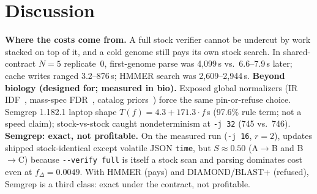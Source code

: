 \documentclass[letterpaper,twocolumn,10pt]{article}
\theoremstyle{definition}
\begin{document}
\section{Discussion}
\label{sec:discussion}

\textbf{Where the costs come from.}
A full stock verifier cannot be undercut by work stacked on top of it, and a cold genome still pays its own stock search.
In shared\nobreakdash-contract $N{=}5$ replicate~0, first\nobreakdash-genome parse was 4{,}099\,s vs.\ 6.6--7.9\,s later; cache writes
ranged 3.2--876\,s; HMMER search was 2{,}609--2{,}944\,s.
\textbf{Beyond biology (designed for; measured in bio).}
Exposed global normalizers (IR IDF~\cite{hadjieleftheriou2009incremental,staudinger2024reproducible}, mass\nobreakdash-spec
{FDR}~\cite{frank2011spectral,aggarwal2022fdr}, catalog priors~\cite{delchambre2023gaia}) force the same pin\nobreakdash-or\nobreakdash-refuse
choice. Semgrep 1.182.1 laptop shape $T(f){=}4.3{+}171.3\cdot f$\,s (97.6\% rule term; not a speed claim); stock\nobreakdash-vs\nobreakdash-stock
caught nondeterminism at \texttt{-j 32} (745 vs.\ 746).
\textbf{Semgrep: exact, not profitable.} On the measured run (\texttt{-j 16}, $r{=}2$), updates shipped stock\nobreakdash-identical
except volatile JSON \texttt{time}, but $S{\approx}0.50$ (A$\rightarrow$B and B$\rightarrow$C) because \texttt{-{}-verify full} is itself a
stock scan and parsing dominates cost even at $f_\Delta{=}0.0049$. With HMMER (pays) and DIAMOND/BLAST+ (refused),
Semgrep is a third class: exact under the contract, not profitable.
\end{document}

